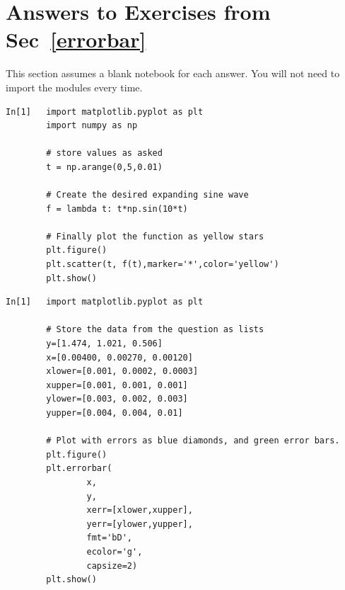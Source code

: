 
\newpage

\section{Answers to Exercises from Sec~\ref{errorbar}}
\label{FigureSection}

This section assumes a blank notebook for each answer. You will not need to import the modules every time.

\begin{lstlisting}[style=PY]
In[1]   import matplotlib.pyplot as plt
        import numpy as np
        
        # store values as asked
        t = np.arange(0,5,0.01)
        
        # Create the desired expanding sine wave
        f = lambda t: t*np.sin(10*t)
        
        # Finally plot the function as yellow stars
        plt.figure()
        plt.scatter(t, f(t),marker='*',color='yellow')
        plt.show()
\end{lstlisting}

\begin{lstlisting}[style=PY]
In[1]   import matplotlib.pyplot as plt
    
        # Store the data from the question as lists
        y=[1.474, 1.021, 0.506]
        x=[0.00400, 0.00270, 0.00120]
        xlower=[0.001, 0.0002, 0.0003]
        xupper=[0.001, 0.001, 0.001]
        ylower=[0.003, 0.002, 0.003]
        yupper=[0.004, 0.004, 0.01]
        
        # Plot with errors as blue diamonds, and green error bars.
        plt.figure()
        plt.errorbar(
                x,
                y,
                xerr=[xlower,xupper],
                yerr=[ylower,yupper],
                fmt='bD',
                ecolor='g',
                capsize=2)
        plt.show()
\end{lstlisting}

\newpage

